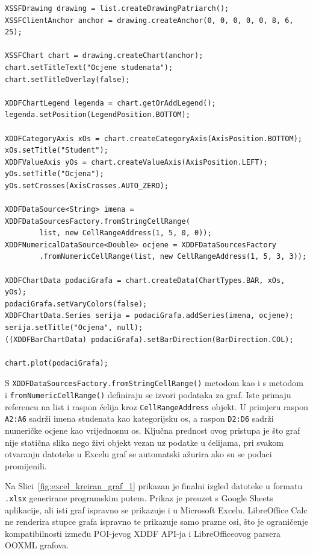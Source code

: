 \documentclass[]{foi}
\begin{document}
\begin{lstlisting}[style=java, caption={Kreiranje stupčastog grafa}]
XSSFDrawing drawing = list.createDrawingPatriarch();
XSSFClientAnchor anchor = drawing.createAnchor(0, 0, 0, 0, 0, 8, 6, 25);

XSSFChart chart = drawing.createChart(anchor);
chart.setTitleText("Ocjene studenata");
chart.setTitleOverlay(false);

XDDFChartLegend legenda = chart.getOrAddLegend();
legenda.setPosition(LegendPosition.BOTTOM);

XDDFCategoryAxis xOs = chart.createCategoryAxis(AxisPosition.BOTTOM);
xOs.setTitle("Student");
XDDFValueAxis yOs = chart.createValueAxis(AxisPosition.LEFT);
yOs.setTitle("Ocjena");
yOs.setCrosses(AxisCrosses.AUTO_ZERO);

XDDFDataSource<String> imena = XDDFDataSourcesFactory.fromStringCellRange(
        list, new CellRangeAddress(1, 5, 0, 0));
XDDFNumericalDataSource<Double> ocjene = XDDFDataSourcesFactory
        .fromNumericCellRange(list, new CellRangeAddress(1, 5, 3, 3));

XDDFChartData podaciGrafa = chart.createData(ChartTypes.BAR, xOs, yOs);
podaciGrafa.setVaryColors(false);
XDDFChartData.Series serija = podaciGrafa.addSeries(imena, ocjene);
serija.setTitle("Ocjena", null);
((XDDFBarChartData) podaciGrafa).setBarDirection(BarDirection.COL);

chart.plot(podaciGrafa);
\end{lstlisting}

S \texttt{XDDFDataSourcesFactory.fromStringCellRange()} metodom kao i s metodom i \texttt{fromNumericCellRange()} definiraju se izvori podataka za graf. Iste primaju referencu na list i raspon ćelija kroz \texttt{CellRangeAddress} objekt. U primjeru raspon \texttt{A2:A6} sadrži imena studenata kao kategorijsku os, a raspon \texttt{D2:D6} sadrži numeričke ocjene kao vrijednosnu os. Ključna prednost ovog pristupa je što graf nije statična slika nego živi objekt vezan uz podatke u ćelijama, pri svakom otvaranju datoteke u Excelu graf se automatski ažurira ako su se podaci promijenili.

Na Slici~\ref{fig:excel_kreiran_graf_1} prikazan je finalni izgled datoteke u formatu \texttt{.xlsx} generirane programskim putem. Prikaz je preuzet s Google Sheets aplikacije, ali isti graf ispravno se prikazuje i u Microsoft Excelu. LibreOffice Calc ne renderira stupce grafa ispravno te prikazuje samo prazne osi, što je ograničenje kompatibilnosti između POI-jevog XDDF API-ja i LibreOfficeovog parsera OOXML grafova.
\end{document}
